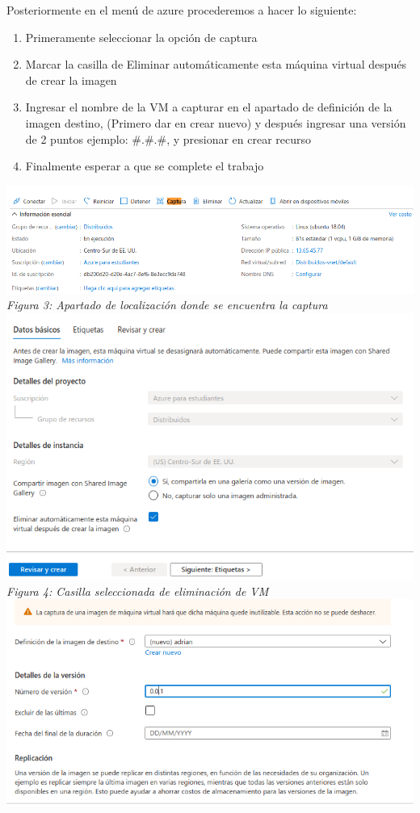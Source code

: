 \documentclass[10pt,executivepaper]{article}
\begin{document}
Posteriormente en el menú de azure procederemos a hacer lo siguiente:
\begin{enumerate}
  \item Primeramente seleccionar la opción de captura
  \item Marcar la casilla de Eliminar automáticamente esta máquina virtual después de crear la imagen
  \item Ingresar el nombre de la VM a capturar en el apartado de definición de la imagen destino, (Primero dar en crear nuevo) y después ingresar una versión de 2 puntos ejemplo: $\#.\#.\#$, y presionar en crear recurso
  \item Finalmente esperar a que se complete el trabajo
\end{enumerate}

\begin{center}
  \includegraphics[scale=0.5]{imgs/3.png}\\
  \textit{Figura 3: Apartado de localización donde se encuentra la captura} \\
  \includegraphics[scale=0.5]{imgs/4.png}\\
  \textit{Figura 4: Casilla seleccionada de eliminación de VM}\\
  \includegraphics[scale=0.5]{imgs/5.png}\\

\end{center}
\end{document}
